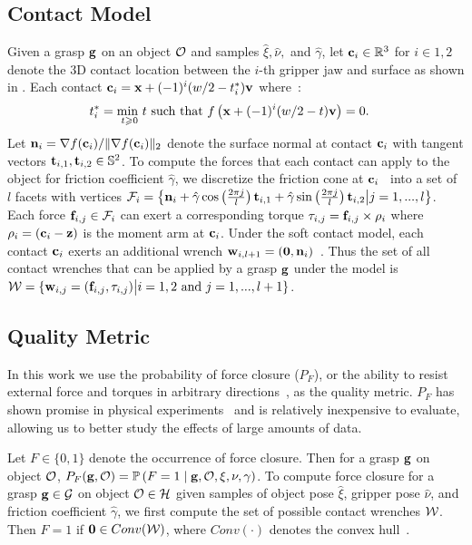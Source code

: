 \subsection{Contact Model}
Given a grasp $\mathbf{g}$ on an object $\mathcal{O}$ and samples $\hat{\xi}, \hat{\nu},$ and $\hat{\gamma}$, let $\mathbf{c}_i \in \mathbb{R}^3$ for $i \in {1, 2}$ denote the 3D contact location between the $i$-th gripper jaw and surface as shown in .
Each contact $\mathbf{c}_i = \mathbf{x} + (-1)^{i} (w / 2 - t_i^*) \mathbf{v}$ where~\cite{mahler2015gp}:
\begin{align*}
	t_i^* &= \underset{t \geqslant 0}{\text{min }} t \text{ such that } f\left(\mathbf{x} +  (-1)^{i} (w / 2 - t) \mathbf{v}\right) = 0.
\end{align*}
\noindent Let $\mathbf{n}_i = \nabla f(\mathbf{c}_i) / \| \nabla f(\mathbf{c}_i) \|_2$ denote the surface normal at contact $\mathbf{c}_i$ with tangent vectors $\mathbf{t}_{i,1}, \mathbf{t}_{i,2} \in \mathbb{S}^2$.
To compute the forces that each contact can apply to the object for friction coefficient $\hat{\gamma}$, we discretize the friction cone at $\mathbf{c}_i$~\cite{pokorny2013c} into a set of $l$ facets with vertices $\mathcal{F}_{i} = \left\{ \mathbf{n}_i + \hat{\gamma} \cos \left( \frac{2 \pi j}{l} \right) \mathbf{t}_{i,1} + \hat{\gamma} \sin \left( \frac{2 \pi j}{l} \right) \mathbf{t}_{i,2} \big| j = 1, ..., l \right\}$.
Each force $\mathbf{f}_{i,j} \in \mathcal{F}_{i}$ can exert a corresponding torque $\tau_{i,j} = \mathbf{f}_{i,j} \times \rho_i$ where $\rho_i = (\mathbf{c}_i - \mathbf{z})$ is the moment arm at $\mathbf{c}_i$.
Under the soft contact model, each contact $\mathbf{c}_i$ exerts an additional wrench $\mathbf{w}_{i,l+1} = (\mathbf{0}, \mathbf{n}_i)$~\cite{zheng2005}.
Thus the set of all contact wrenches that can be applied by a grasp $\mathbf{g}$ under the model is $\mathcal{W} = \{ \mathbf{w}_{i,j} = (\mathbf{f}_{i,j}, \tau_{i,j}) \big| i = 1, 2 \text{ and } j = 1, ..., l+1\}$.

\subsection{Quality Metric}
In this work we use the probability of force closure ($P_F$), or the ability to resist external force and torques in arbitrary directions~\cite{mahler2015gp}, as the quality metric.
$P_F$ has shown promise in physical experiments~\cite{kim2012physically, weisz2012pose} and is relatively inexpensive to evaluate, allowing us to better study the effects of large amounts of data.

Let $F \in \{0, 1\}$ denote the occurrence of force closure.
Then for a grasp $\mathbf{g}$ on object $\mathcal{O}$, $P_F(\mathbf{g}, \mathcal{O}) = \mathbb{P}\left(F = 1 \mid \mathbf{g}, \mathcal{O}, \xi, \nu, \gamma \right)$.
To compute force closure for a grasp $\mathbf{g} \in \mathcal{G}$ on object $\mathcal{O} \in \mathcal{H}$ given samples of object pose $\hat{\xi}$, gripper pose $\hat{\nu}$, and friction coefficient $\hat{\gamma}$, we first compute the set of possible contact wrenches $\mathcal{W}$.
Then $F = 1$ if $\mathbf{0} \in Conv(\mathcal{W})$, where $Conv(\cdot)$ denotes the convex hull~\cite{weisz2012pose}.

